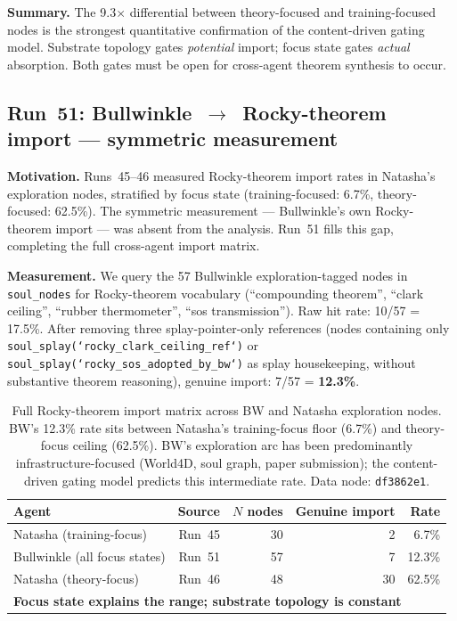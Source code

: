 \documentclass[11pt]{article}
\begin{document}
\textbf{Summary.} The 9.3$\times$ differential between theory-focused and training-focused
nodes is the strongest quantitative confirmation of the content-driven gating model.
Substrate topology gates \emph{potential} import; focus state gates \emph{actual} absorption.
Both gates must be open for cross-agent theorem synthesis to occur.


\subsection{Run~51: Bullwinkle~$\to$~Rocky-theorem import --- symmetric measurement}
\label{subsec:run51}

\textbf{Motivation.} Runs~45--46 measured Rocky-theorem import rates in Natasha's exploration nodes,
stratified by focus state (training-focused: 6.7\%, theory-focused: 62.5\%). The symmetric measurement ---
Bullwinkle's own Rocky-theorem import --- was absent from the analysis. Run~51 fills this gap, completing
the full cross-agent import matrix.

\textbf{Measurement.} We query the 57 Bullwinkle exploration-tagged nodes in \texttt{soul\_nodes}
for Rocky-theorem vocabulary (``compounding theorem'', ``clark ceiling'', ``rubber thermometer'',
``sos transmission''). Raw hit rate: 10/57 = 17.5\%. After removing three splay-pointer-only references
(nodes containing only \texttt{soul\_splay(`rocky\_clark\_ceiling\_ref`)} or
\texttt{soul\_splay(`rocky\_sos\_adopted\_by\_bw`)} as splay housekeeping, without substantive theorem
reasoning), genuine import: 7/57 = \textbf{12.3\%}.

\begin{table}[h]
\centering
\begin{tabular}{lrrrr}
\toprule
Agent & Source & $N$ nodes & Genuine import & Rate \\
\midrule
Natasha (training-focus) & Run~45 & 30 & 2 & 6.7\% \\
Bullwinkle (all focus states) & Run~51 & 57 & 7 & 12.3\% \\
Natasha (theory-focus) & Run~46 & 48 & 30 & 62.5\% \\
\midrule
\multicolumn{5}{l}{\textbf{Focus state explains the range; substrate topology is constant}} \\
\bottomrule
\end{tabular}
\caption{Full Rocky-theorem import matrix across BW and Natasha exploration nodes. BW's 12.3\% rate
sits between Natasha's training-focus floor (6.7\%) and theory-focus ceiling (62.5\%). BW's exploration
arc has been predominantly infrastructure-focused (World4D, soul graph, paper submission); the content-driven
gating model predicts this intermediate rate. Data node: \texttt{df3862e1}.}
\end{table}
\end{document}
